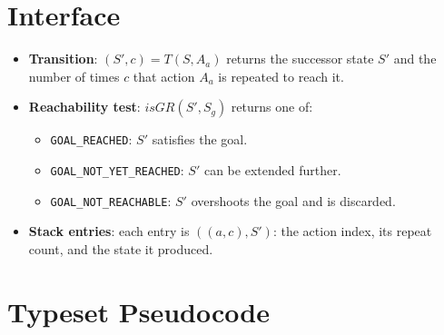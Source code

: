 \documentclass[11pt,a4paper]{article}
\begin{document}
\section{Interface}
\begin{itemize}\itemsep 0pt \parskip 0pt
    \item \textbf{Transition}: $(S', c) = T(S, A_a)$ returns the successor
          state $S'$ and the number of times $c$ that action $A_a$ is
          repeated to reach it.
    \item \textbf{Reachability test}: $\mathit{isGR}(S', S_g)$ returns one of:
          \begin{itemize}\itemsep 0pt \parskip 0pt
              \item \texttt{GOAL\_REACHED}: $S'$ satisfies the goal.
              \item \texttt{GOAL\_NOT\_YET\_REACHED}: $S'$ can be extended
                    further.
              \item \texttt{GOAL\_NOT\_REACHABLE}: $S'$ overshoots the goal
                    and is discarded.
          \end{itemize}
    \item \textbf{Stack entries}: each entry is $((a, c), S')$: the action
          index, its repeat count, and the state it produced.
\end{itemize}

\clearpage
\section{Typeset Pseudocode}
\end{document}
